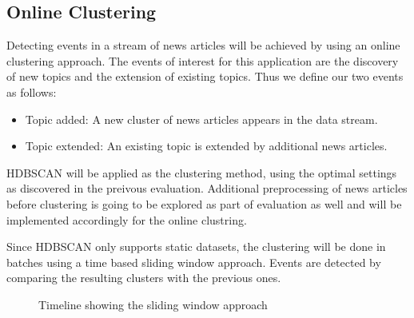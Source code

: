 \subsection{Online Clustering}

Detecting events in a stream of news articles will be achieved by using an online clustering approach. The events of interest for this application are the discovery of new topics and the extension of existing topics. Thus we define our two events as follows:

\begin{itemize}
    \item Topic added: A new cluster of news articles appears in the data stream.
    \item Topic extended: An existing topic is extended by additional news articles.
\end{itemize}

HDBSCAN will be applied as the clustering method, using the optimal settings as discovered in the preivous evaluation. Additional preprocessing of news articles before clustering is going to be explored as part of evaluation as well and will be implemented accordingly for the online clustring.

Since HDBSCAN only supports static datasets, the clustering will be done in batches using a time based sliding window approach. Events are detected by comparing the resulting clusters with the previous ones.

\begin{figure}[h]
    \centering


    \caption{Timeline showing the sliding window approach}
    \label{fig:timeline}
\end{figure}

